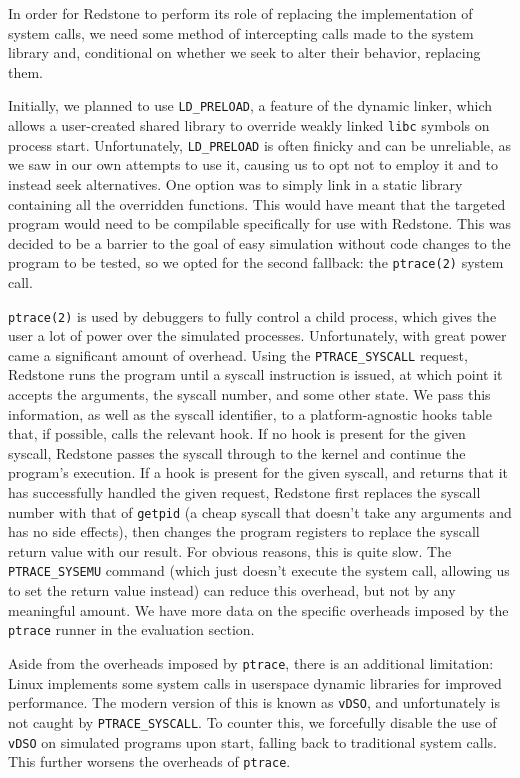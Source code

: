 {\fontsize{12}{15}\selectfont 
In order for Redstone to perform its role of replacing the implementation of system calls,
we need some method of intercepting calls made to the system library and,
conditional on whether we seek to alter their behavior,
replacing them.

Initially, we planned to use \texttt{LD\_PRELOAD},
a feature of the dynamic linker,
which allows a user-created shared library to override weakly linked \texttt{libc} symbols on process start.
Unfortunately,
\texttt{LD\_PRELOAD} is often finicky and can be unreliable,
as we saw in our own attempts to use it,
causing us to opt not to employ it and to instead seek alternatives.
One option was to simply link in a static library containing all the overridden functions.
This would have meant that the targeted program would need to be compilable specifically for use with Redstone.
This was decided to be a barrier to the goal of easy simulation without code changes to the program to be tested,
so we opted for the second fallback: the \texttt{ptrace(2)} system call.

\texttt{ptrace(2)} is used by debuggers to fully control a child process,
which gives the user a lot of power over the simulated processes.
Unfortunately,
with great power came a significant amount of overhead.
Using the \texttt{PTRACE\_SYSCALL} request,
Redstone runs the program until a syscall instruction is issued,
at which point it accepts the arguments,
the syscall number, and some other state.
We pass this information, as well as the syscall identifier,
to a platform-agnostic hooks table that, if possible,  calls the relevant hook.
If no hook is present for the given syscall,
Redstone passes the syscall through to the kernel and continue the program's execution.
If a hook is present for the given syscall,
and returns that it has successfully handled the given request,
Redstone first replaces the syscall number with that of \texttt{getpid}
(a cheap syscall that doesn’t take any arguments and has no side effects),
then changes the program registers to replace the syscall return value with our result.
For obvious reasons, this is quite slow.
The \texttt{PTRACE\_SYSEMU} command
(which just doesn’t execute the system call, allowing us to set the return value instead)
can reduce this overhead,
but not by any meaningful amount.
We have more data on the specific overheads imposed by the \texttt{ptrace} runner in the evaluation section.

Aside from the overheads imposed by \texttt{ptrace},
there is an additional limitation:
Linux implements some system calls in userspace dynamic libraries for improved performance.
The modern version of this is known as \texttt{vDSO},
and unfortunately is not caught by \texttt{PTRACE\_SYSCALL}.
To counter this, we forcefully disable the use of \texttt{vDSO} on simulated programs upon start,
falling back to traditional system calls.
This further worsens the overheads of \texttt{ptrace}.

}
